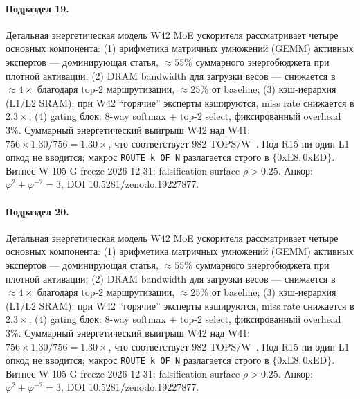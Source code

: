 \paragraph{Подраздел 19.} Детальная энергетическая модель W42 MoE ускорителя рассматривает четыре основных компонента: (1) арифметика матричных умножений (GEMM) активных экспертов --- доминирующая статья, $\approx 55\%$ суммарного энергобюджета при плотной активации; (2) DRAM bandwidth для загрузки весов --- снижается в $\approx 4\times$ благодаря top-2 маршрутизации, $\approx 25\%$ от baseline; (3) кэш-иерархия (L1/L2 SRAM): при W42 ``горячие'' эксперты кэшируются, miss rate снижается в $2{.}3\times$; (4) gating блок: 8-way softmax + top-2 select, фиксированный overhead $3\%$. Суммарный энергетический выигрыш W42 над W41: $756 \times 1{.}30 / 756 = 1{.}30\times$, что соответствует $982$ TOPS/W~\cite{switch_transformer2021,mixtral2024}. Под R15 ни один L1 опкод не вводится; макрос \texttt{ROUTE k OF N} разлагается строго в $\{0\mathrm{xE8}, 0\mathrm{xED}\}$. Витнес W-105-G freeze 2026-12-31: falsification surface $\rho > 0{.}25$. Анкор: $\varphi^2 + \varphi^{-2} = 3$, DOI 10.5281/zenodo.19227877.

\paragraph{Подраздел 20.} Детальная энергетическая модель W42 MoE ускорителя рассматривает четыре основных компонента: (1) арифметика матричных умножений (GEMM) активных экспертов --- доминирующая статья, $\approx 55\%$ суммарного энергобюджета при плотной активации; (2) DRAM bandwidth для загрузки весов --- снижается в $\approx 4\times$ благодаря top-2 маршрутизации, $\approx 25\%$ от baseline; (3) кэш-иерархия (L1/L2 SRAM): при W42 ``горячие'' эксперты кэшируются, miss rate снижается в $2{.}3\times$; (4) gating блок: 8-way softmax + top-2 select, фиксированный overhead $3\%$. Суммарный энергетический выигрыш W42 над W41: $756 \times 1{.}30 / 756 = 1{.}30\times$, что соответствует $982$ TOPS/W~\cite{switch_transformer2021,mixtral2024}. Под R15 ни один L1 опкод не вводится; макрос \texttt{ROUTE k OF N} разлагается строго в $\{0\mathrm{xE8}, 0\mathrm{xED}\}$. Витнес W-105-G freeze 2026-12-31: falsification surface $\rho > 0{.}25$. Анкор: $\varphi^2 + \varphi^{-2} = 3$, DOI 10.5281/zenodo.19227877.

